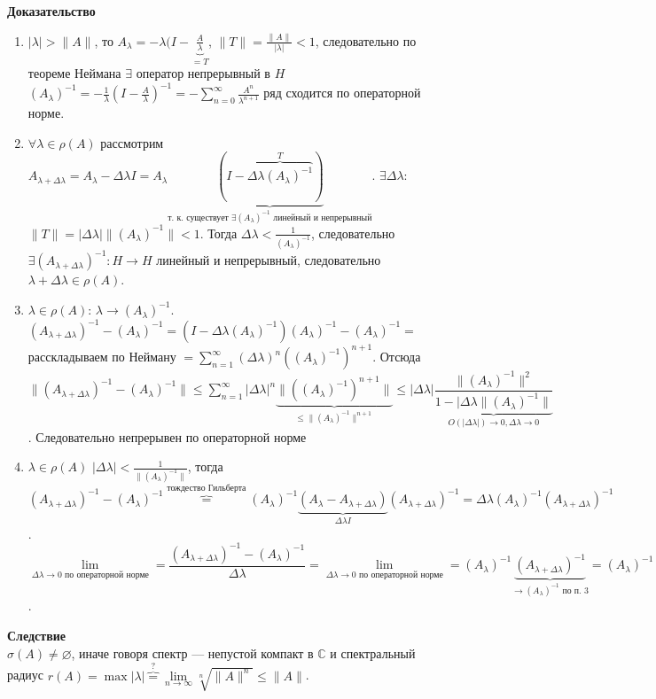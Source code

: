 \documentclass[12pt]{article}
\newcommand{\Al}{A_\lambda}
\newcommand{\Alo}{(\Al)^{-1}}
\begin{document}
\textbf{Доказательство}\\
\begin{enumerate}
    \item{$|\lambda| > \|A\|$, то $\Al = -\lambda(I - \underbrace{\frac{A}{\lambda}}_{=T}$, $\|T\| = \frac{\|A\|}{|\lambda|}<1$,
        следовательно по теореме Неймана $\exists$ оператор непрерывный в $H$ $\Alo = -\frac{1}{\lambda}(I - \frac{A}{\lambda})^{-1} =
        -\sum_{n=0}^\infty \frac{A^n}{\lambda^{n+1}}$ ряд сходится по операторной норме.}
    \item{$\forall \lambda \in \rho(A)$ рассмотрим $A_{\lambda + \Delta\lambda} = \Al - \Delta\lambda I = \Al\underbrace{(I - 
        \overbrace{\Delta\lambda\Alo}^{T})}_{\text{т. к. существует $\exists \Alo$ линейный и непрерывный}}$.
        $\exists \Delta\lambda$: $\|T\|=|\Delta\lambda|\|\Alo\| < 1$.
        Тогда $\Delta\lambda < \frac{1}{\Alo}$, следовательно $\exists (A_{\lambda+\Delta\lambda})^{-1} : H \to H$ линейный и непрерывный, следовательно
        $\lambda + \Delta\lambda \in \rho(A)$.}
    \item{$\lambda \in \rho(A)$: $\lambda \to \Alo$.
        $(A_{\lambda + \Delta\lambda})^{-1} - \Alo = (I - \Delta\lambda\Alo)\Alo - \Alo \boxed{=}$ расскладываем по Нейману $\boxed{=} \sum_{n=1}^\infty
        (\Delta\lambda)^n(\Alo)^{n+1}$.
        Отсюда $\|(A_{\lambda + \Delta\lambda})^{-1} - \Alo\| \le \sum_{n=1}^\infty |\Delta\lambda|^n\underbrace{\|(\Alo)^{n+1}\|}_{\le \|\Alo\|^{n+1}} \le
        |\Delta\lambda| \underbrace{\dfrac{\|\Alo\|^2}{1-|\Delta\lambda\|\Alo\|}}_{O(|\Delta\lambda|) \to 0, \Delta\lambda \to 0}$. Следовательно непрерывен
        по операторной норме}
    \item{$\lambda \in \rho(A)$ $|\Delta\lambda| < \frac{1}{\|\Alo\|}$, тогда $(A_{\lambda + \Delta\lambda})^{-1} - \Alo \overbrace{=}^{\text{тождество Гильберта}}
        \Alo\underbrace{(\Al - A_{\lambda + \Delta\lambda})}_{\Delta\lambda I}(A_{\lambda + \Delta\lambda})^{-1} = \Delta\lambda \Alo (A_{\lambda + \Delta \lambda})^{-1}$.
        $\lim \limits_{\Delta\lambda \to 0 \text{ по операторной норме}} = \dfrac{(A_{\lambda + \Delta\lambda})^{-1} - \Alo}{\Delta\lambda} = 
        \lim \limits_{\Delta\lambda \to 0 \text{ по операторной норме}} = \Alo \underbrace{(A_{\lambda + \Delta\lambda})^{-1}}_{\to \Alo \text{ по п. 3}} =
        \Alo \Alo$.}
\end{enumerate}

\textbf{Следствие}\\
$\sigma(A) \ne \varnothing$, иначе говоря спектр --- непустой компакт в $\mathbb C$ и спектральный радиус $r(A) = \max |\lambda| \overbrace{=}^{?}
\lim \limits_{n \to \infty} \sqrt[n]{\|A\|^n} \le \|A\|$.
\end{document}
